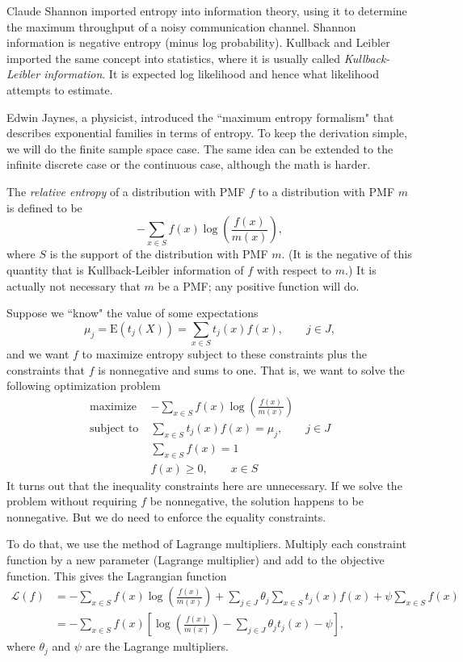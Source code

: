 \documentclass[12pt]{article}
\newcommand{\E}{\mathrm{E}}
\DeclareMathOperator{\E}{E}
\begin{document}
Claude Shannon imported entropy into information theory, using it to determine the maximum throughput of a noisy communication channel. Shannon information is negative entropy (minus log probability). Kullback and Leibler imported the same concept into statistics, where it is usually called \emph{Kullback-Leibler information}. It is expected log likelihood and hence what likelihood attempts to estimate.

Edwin Jaynes, a physicist, introduced the ``maximum entropy formalism" that describes exponential families in terms of entropy. To keep the derivation simple, we will do the finite sample space case. The same idea can be extended to the infinite discrete case or the continuous case, although the math is harder.

The \emph{relative entropy} of a distribution with PMF $f$ to a distribution with PMF $m$ is defined to be 
$$
  -\sum_{x\in S} f(x)\log\left(\frac{f(x)}{m(x)}\right),
$$
where $S$ is the support of the distribution with PMF $m$. (It is the negative of this quantity that is Kullback-Leibler information of $f$ with respect to $m$.) It is actually not necessary that $m$ be a PMF; any positive function will do.


Suppose we ``know" the value of some expectations
$$
  \mu_j = \E\left(t_j(X)\right) = \sum_{x\in S} t_j(x)f(x), \qquad j \in J,
$$
and we want $f$ to maximize entropy subject to these constraints plus the constraints that $f$ is nonnegative and sums to one. That is, we want to solve the following optimization problem
\begin{align*}
	\text{maximize} \;& -\sum_{x \in S} f(x)\log\left(\frac{f(x)}{m(x)}\right) \\
	\text{subject to} \;& \sum_{x\in S} t_j(x)f(x) = \mu_j, \qquad j \in J \\
	&\sum_{x \in S} f(x) = 1 \\
	&f(x) \geq 0, \qquad x \in S
\end{align*}
It turns out that the inequality constraints here are unnecessary. If we solve the problem without requiring $f$ be nonnegative, the solution happens to be nonnegative. But we do need to enforce the equality constraints.

To do that, we use the method of Lagrange multipliers. Multiply each constraint function by a new parameter (Lagrange multiplier) and add to the objective function. This gives the Lagrangian function
\begin{align*}
	\mathcal{L}(f) &= -\sum_{x \in S} f(x)\log\left(\frac{f(x)}{m(x)}\right) 
	  + \sum_{j\in J}\theta_j \sum_{x\in S} t_j(x)f(x) + \psi\sum_{x \in S} f(x) \\
	  &= -\sum_{x \in S} f(x)\left[\log\left(\frac{f(x)}{m(x)}\right) - \sum_{j\in J}\theta_j t_j(x) - \psi\right],
\end{align*}
where $\theta_j$ and $\psi$ are the Lagrange multipliers.
\end{document}
